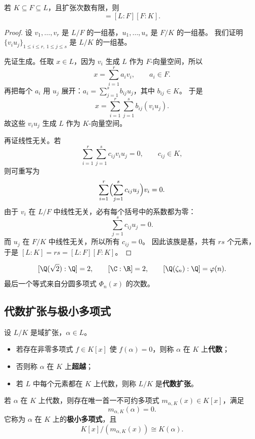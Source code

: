\begin{theorem}[塔定理]
若 $K\subseteq F\subseteq L$，且扩张次数有限，则
\begin{equation}
  [L:K]=[L:F][F:K].
\end{equation}
\end{theorem}

\begin{proof}
设 $v_1,\dots,v_r$ 是 $L/F$ 的一组基，$u_1,\dots,u_s$ 是 $F/K$ 的一组基。
我们证明 $\{v_i u_j\}_{1\le i\le r,\ 1\le j\le s}$ 是 $L/K$ 的一组基。

先证生成。任取 $x\in L$，因为 $v_i$ 生成 $L$ 作为 $F$-向量空间，所以
\[
  x=\sum_{i=1}^r a_i v_i,
  \qquad a_i\in F.
\]
再把每个 $a_i$ 用 $u_j$ 展开：$a_i=\sum_{j=1}^s b_{ij}u_j$，其中 $b_{ij}\in K$。
于是
\[
  x=\sum_{i=1}^r\sum_{j=1}^s b_{ij}(v_i u_j).
\]
故这些 $v_i u_j$ 生成 $L$ 作为 $K$-向量空间。

再证线性无关。若
\[
  \sum_{i=1}^r\sum_{j=1}^s c_{ij} v_i u_j=0,
  \qquad c_{ij}\in K,
\]
则可重写为
\[
  \sum_{i=1}^r \Bigl(\sum_{j=1}^s c_{ij}u_j\Bigr) v_i=0.
\]
由于 $v_i$ 在 $L/F$ 中线性无关，必有每个括号中的系数都为零：
\[
  \sum_{j=1}^s c_{ij}u_j=0.
\]
而 $u_j$ 在 $F/K$ 中线性无关，所以所有 $c_{ij}=0$。
因此该族是基，共有 $rs$ 个元素，于是
$[L:K]=rs=[L:F][F:K]$。
\end{proof}

\begin{example}
\[
  [\Q(\sqrt 2):\Q]=2,
  \qquad
  [\C:\R]=2,
  \qquad
  [\Q(\zeta_n):\Q]=\varphi(n).
\]
最后一个等式来自分圆多项式 $\Phi_n(x)$ 的次数。
\end{example}

\subsection{代数扩张与极小多项式}

\begin{definition}[代数与超越]
设 $L/K$ 是域扩张，$\alpha\in L$。
\begin{itemize}
  \item 若存在非零多项式 $f\in K[x]$ 使 $f(\alpha)=0$，则称 $\alpha$ 在 $K$ 上\textbf{代数}；
  \item 否则称 $\alpha$ 在 $K$ 上\textbf{超越}；
  \item 若 $L$ 中每个元素都在 $K$ 上代数，则称 $L/K$ 是\textbf{代数扩张}。
\end{itemize}
\end{definition}

\begin{theorem}[极小多项式的存在唯一性]
若 $\alpha$ 在 $K$ 上代数，则存在唯一首一不可约多项式 $m_{\alpha,K}(x)\in K[x]$，满足
\begin{equation}
  m_{\alpha,K}(\alpha)=0.
\end{equation}
它称为 $\alpha$ 在 $K$ 上的\textbf{极小多项式}，且
\begin{equation}
  K[x]/(m_{\alpha,K}(x))\cong K(\alpha).
\end{equation}
\end{theorem}

